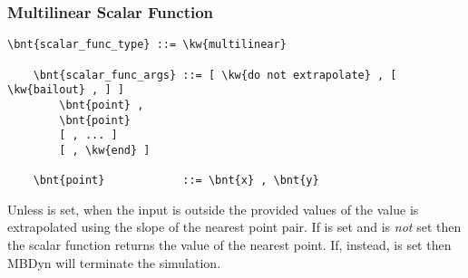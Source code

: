 \subsubsection{Multilinear Scalar Function}
\begin{Verbatim}[commandchars=\\\{\}]
    \bnt{scalar_func_type} ::= \kw{multilinear}

    \bnt{scalar_func_args} ::= [ \kw{do not extrapolate} , [ \kw{bailout} , ] ]
        \bnt{point} ,
        \bnt{point}
        [ , ... ]
        [ , \kw{end} ]

    \bnt{point}            ::= \bnt{x} , \bnt{y}
\end{Verbatim}
Unless  is set, when the input is outside
the provided values of  the value is extrapolated using the slope
of the nearest point pair.
If  is set and 
is \emph{not} set then the scalar function returns the value of the nearest point.
If, instead,  is set then MBDyn will terminate the simulation.

